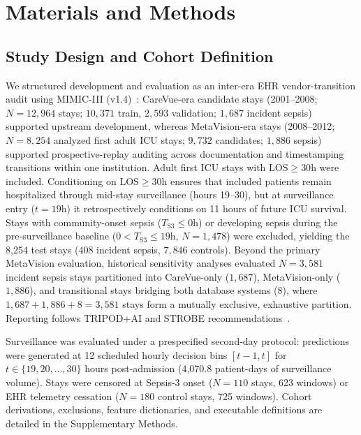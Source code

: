 \documentclass[10pt,twocolumn,a4paper]{article}
\begin{document}
\section{Materials and Methods}

\subsection{Study Design and Cohort Definition}
We structured development and evaluation as an inter-era EHR vendor-transition audit using MIMIC-III (v1.4)~\cite{johnson2016mimiciii}: CareVue-era candidate stays (2001--2008; $N=12,964$ stays; $10,371$ train, $2,593$ validation; $1,687$ incident sepsis) supported upstream development, whereas MetaVision-era stays (2008--2012; $N=8,254$ analyzed first adult ICU stays; $9,732$ candidates; $1,886$ sepsis) supported prospective-replay auditing across documentation and timestamping transitions within one institution. Adult first ICU stays with $\text{LOS} \ge 30\text{h}$ were included. Conditioning on $\text{LOS} \ge 30\text{h}$ ensures that included patients remain hospitalized through mid-stay surveillance (hours 19--30), but at surveillance entry ($t=19\text{h}$) it retrospectively conditions on 11 hours of future ICU survival. Stays with community-onset sepsis ($T_{\text{S3}} \le 0\text{h}$) or developing sepsis during the pre-surveillance baseline ($0 < T_{\text{S3}} \le 19\text{h}$, $N=1,478$) were excluded, yielding the 8,254 test stays ($408$ incident sepsis, $7,846$ controls). Beyond the primary MetaVision evaluation, historical sensitivity analyses evaluated $N=3,581$ incident sepsis stays partitioned into CareVue-only ($1,687$), MetaVision-only ($1,886$), and transitional stays bridging both database systems ($8$), where $1,687 + 1,886 + 8 = 3,581$ stays form a mutually exclusive, exhaustive partition. Reporting follows TRIPOD+AI and STROBE recommendations~\cite{collins2024tripod,vonelm2007strobe}.

Surveillance was evaluated under a prespecified second-day protocol: predictions were generated at 12 scheduled hourly decision bins $[t-1, t]$ for $t \in \{19, 20, \dots, 30\}$ hours post-admission (4,070.8 patient-days of surveillance volume). Stays were censored at Sepsis-3 onset ($N=110$ stays, 623 windows) or EHR telemetry cessation ($N=180$ control stays, 725 windows). Cohort derivations, exclusions, feature dictionaries, and executable definitions are detailed in the Supplementary Methods.
\end{document}

